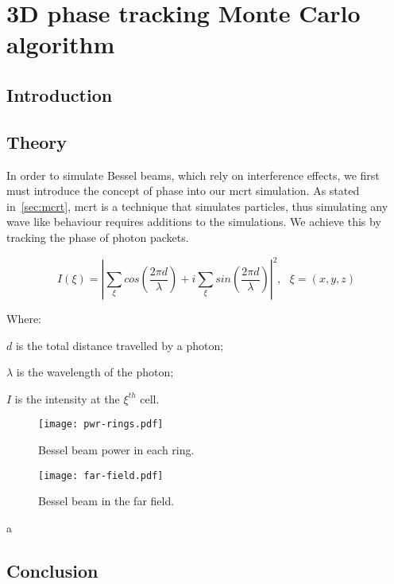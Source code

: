 \chapter{3D phase tracking Monte Carlo algorithm}
\label{sec:phase}
\section{Introduction}

\section{Theory}

In order to simulate Bessel beams, which rely on interference effects, we first must introduce the concept of phase into our \gls{mcrt} simulation. As stated in~\cref{sec:mcrt}, \gls{mcrt} is a technique that simulates particles, thus simulating any wave like behaviour requires additions to the simulations. We achieve this by tracking the phase of photon packets. 

\begin{equation}
I(\xi)=\left| \sum\limits_{\xi}cos\left(\frac{2\pi d}{\lambda}\right) + i \sum\limits_{\xi}sin\left(\frac{2\pi d}{\lambda}\right)\right|^2,\ \ \ \xi=(x,y,z)
\end{equation}

\noindent Where:

\indent $d$ is the total distance travelled by a photon;

\indent $\lambda$ is the wavelength of the photon;

\indent $I$ is the intensity at the $\xi^{th}$ cell.

\medskip

\begin{figure}
\centering
\texttt{[image: pwr-rings.pdf]}
\caption{Bessel beam power in each ring.}
\label{fig:pwrring}
\end{figure}

\begin{figure}
\centering
\texttt{[image: far-field.pdf]}
\caption{Bessel beam in the far field.}
\label{fig:farfield}
\end{figure}


a~\cite{mignon2016fractional}
\section{Conclusion}
